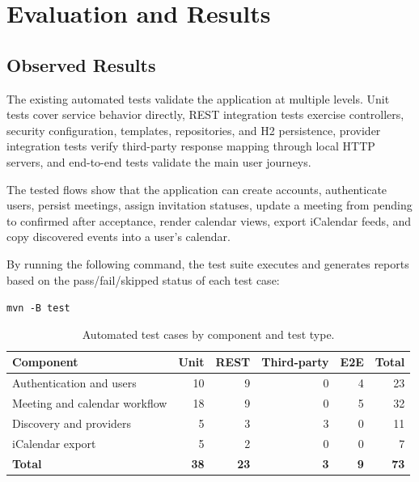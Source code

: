 \chapter{Evaluation and Results} \label{cap:results}

\section{Observed Results}

The existing automated tests validate the application at multiple levels. Unit tests cover service behavior directly, REST integration tests exercise controllers, security configuration, templates, repositories, and H2 persistence, provider integration tests verify third-party response mapping through local HTTP servers, and end-to-end tests validate the main user journeys.

The tested flows show that the application can create accounts, authenticate users, persist meetings, assign invitation statuses, update a meeting from pending to confirmed after acceptance, render calendar views, export iCalendar feeds, and copy discovered events into a user's calendar.

By running the following command, the test suite executes and generates reports based on the pass/fail/skipped status of each test case:

\begin{center}
\texttt{mvn -B test}
\end{center}

\begin{table}[H]
\centering
\begin{tabular}{|l|r|r|r|r|r|}
\hline
\textbf{Component} & \textbf{Unit} & \textbf{REST} & \textbf{Third-party} & \textbf{E2E} & \textbf{Total} \\
\hline
Authentication and users & 10 & 9 & 0 & 4 & 23 \\
Meeting and calendar workflow & 18 & 9 & 0 & 5 & 32 \\
Discovery and providers & 5 & 3 & 3 & 0 & 11 \\
iCalendar export & 5 & 2 & 0 & 0 & 7 \\
\hline
\textbf{Total} & \textbf{38} & \textbf{23} & \textbf{3} & \textbf{9} & \textbf{73} \\
\hline
\end{tabular}
\caption{Automated test cases by component and test type.}
\label{tab:test-coverage}
\end{table}

